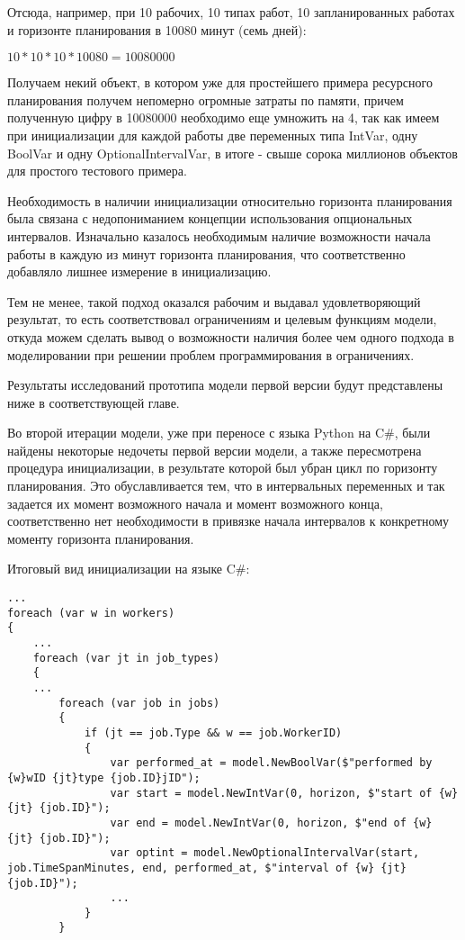 Отсюда, например, при 10 рабочих, 10 типах работ, 10 запланированных работах и горизонте планирования в 10080 минут (семь дней):

$10 * 10 * 10 * 10080 = 10080000$

Получаем некий объект, в котором уже для простейшего примера ресурсного планирования получем непомерно огромные затраты по памяти, причем полученную цифру в 10080000 необходимо еще умножить на 4, так как имеем при инициализации для каждой работы две переменных типа IntVar, одну BoolVar и одну OptionalIntervalVar, в итоге - свыше сорока миллионов объектов для простого тестового примера.

Необходимость в наличии инициализации относительно горизонта планирования была связана с недопониманием концепции использования опциональных интервалов. Изначально казалось необходимым наличие возможности начала работы в каждую из минут горизонта планирования, что соответственно добавляло лишнее измерение в инициализацию.

Тем не менее, такой подход оказался рабочим и выдавал удовлетворяющий результат, то есть соответствовал ограничениям и целевым функциям модели, откуда можем сделать вывод о возможности наличия более чем одного подхода в моделировании при решении проблем программирования в ограничениях.

Результаты исследований прототипа модели первой версии будут представлены ниже в соответствующей главе.

Во второй итерации модели, уже при переносе с языка Python на C\#, были найдены некоторые недочеты первой версии модели, а также пересмотрена процедура инициализации, в результате которой был убран цикл по горизонту планирования. Это обуславливается тем, что в интервальных переменных и так задается их момент возможного начала и момент возможного конца, соответственно нет необходимости в привязке начала интервалов к конкретному моменту горизонта планирования.

Итоговый вид инициализации на языке C\#:

\begin{verbatim}
...
foreach (var w in workers)
{
    ...
    foreach (var jt in job_types)
    {
    ...
        foreach (var job in jobs)
        {
            if (jt == job.Type && w == job.WorkerID)
            {
                var performed_at = model.NewBoolVar($"performed by {w}wID {jt}type {job.ID}jID");
                var start = model.NewIntVar(0, horizon, $"start of {w} {jt} {job.ID}");
                var end = model.NewIntVar(0, horizon, $"end of {w} {jt} {job.ID}");
                var optint = model.NewOptionalIntervalVar(start, job.TimeSpanMinutes, end, performed_at, $"interval of {w} {jt} {job.ID}");
                ...
            }
        }
\end{verbatim}

